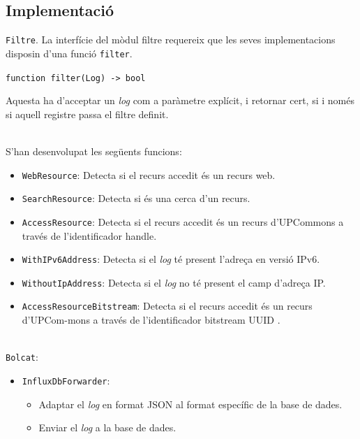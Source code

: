 \subsection{Implementació}\label{subsec:log-implementation}

\noindent
\texttt{Filtre}.
La interfície del mòdul filtre requereix que les seves implementacions disposin d'una funció \texttt{filter}.
\begin{center}
    \texttt{function filter(Log) -> bool}
\end{center}
Aquesta ha d'acceptar un \textit{\gls{log}} com a paràmetre explícit, i retornar cert, si i només si aquell registre passa el filtre definit.

\noindent \\
S'han desenvolupat les següents funcions:

\begin{itemize}
    \item \texttt{WebResource}: Detecta si el recurs accedit és un recurs web.
    \item \texttt{SearchResource}: Detecta si és una cerca d’un recurs.
    \item \texttt{AccessResource}: Detecta si el recurs accedit és un recurs d’\gls{UPCommons} a través de l'identificador \gls{handle}.
    \item \texttt{WithIPv6Address}: Detecta si el \textit{\gls{log}} té present l’adreça en versió IPv6.
    \item \texttt{WithoutIpAddress}: Detecta si el \textit{\gls{log}} no té present el camp d'adreça \gls{IP}.
    \item \texttt{AccessResourceBitstream}: Detecta si el recurs accedit és un recurs d’UPCom-mons a través de l'identificador \gls{bitstream} \gls{UUID} .
\end{itemize}

\noindent \\
\texttt{Bolcat}:
\begin{itemize}
    \item \texttt{InfluxDbForwarder}:
    \begin{itemize}
        \item Adaptar el \textit{\gls{log}} en format JSON al format específic de la base de dades.
        \item Enviar el \textit{\gls{log}} a la base de dades.
    \end{itemize}
\end{itemize}

\clearpage


